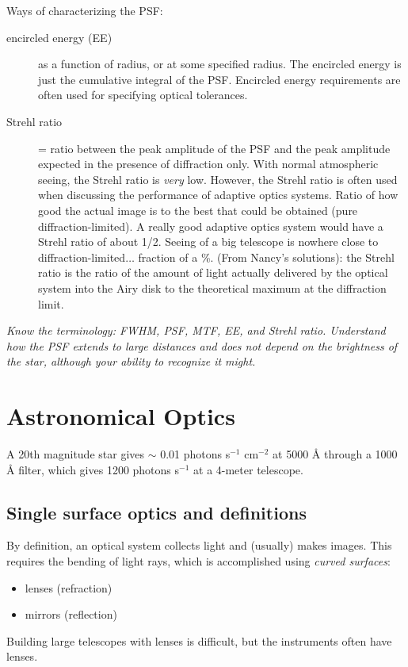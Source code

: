 \documentclass[12pt]{article}
\newcommand{\mynotes}[1]{\textcolor{myBlue}{#1}}
\newcommand{\test}[1]{%
    \begin{center}
        {\parbox{0.9\textwidth}{\textit{\small#1}}}
    \end{center}}
\begin{document}
Ways of characterizing the PSF:
\begin{description}
    \item [encircled energy (EE)] as a function of radius, or at some specified
        radius. The encircled energy is just the cumulative integral of the
        PSF\@. Encircled energy requirements are often used for specifying
        optical tolerances.
    \item [Strehl ratio] = ratio
        between the peak amplitude of the PSF and the peak amplitude expected
        in the presence of diffraction only. With normal atmospheric seeing,
        the Strehl ratio is \emph{very} low. However, the Strehl ratio is often
        used when discussing the performance of adaptive optics systems.
        \mynotes{Ratio of how good the actual image is to the best that could
        be obtained (pure diffraction-limited). A really good adaptive optics
        system would have a Strehl ratio of about 1/2. Seeing of a big
        telescope is nowhere close to diffraction-limited$\ldots$ fraction of a
        \%. (From Nancy's solutions): the Strehl ratio is the ratio of the
        amount of light actually delivered by the optical system into the Airy
        disk to the theoretical maximum at the diffraction limit.}
\end{description}

\test{Know the terminology: FWHM, PSF, MTF, EE, and Strehl ratio.
Understand how the PSF extends to large distances and does not depend on
the brightness of the star, although your ability to recognize it might.}

\newpage
\section{Astronomical Optics}
A 20th magnitude star gives $\sim$ 0.01 photons s$^{-1}$ cm$^{-2}$
at 5000 \AA{} through a 1000 \AA{} filter, which gives 1200
photons s$^{-1}$ at a 4-meter telescope.

\subsection{Single surface optics and definitions}
By definition, an optical system collects light and (usually) makes images.
This requires the bending of light rays, which is accomplished using
\textit{curved surfaces}:
\begin{itemize}
    \item lenses (refraction)
    \item mirrors (reflection)
\end{itemize}
Building large telescopes with lenses is difficult, but the
instruments often have lenses.
\end{document}
